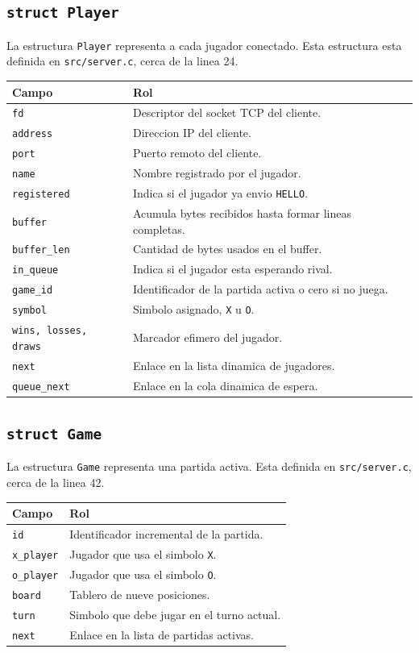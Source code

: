 \documentclass[12pt,a4paper]{article}
\begin{document}
\subsection{\texttt{struct Player}}

La estructura \texttt{Player} representa a cada jugador conectado. Esta
estructura esta definida en \texttt{src/server.c}, cerca de la linea 24.

\begin{longtable}{|p{4cm}|p{10cm}|}
\hline
\textbf{Campo} & \textbf{Rol} \\
\hline
\texttt{fd} & Descriptor del socket TCP del cliente. \\
\hline
\texttt{address} & Direccion IP del cliente. \\
\hline
\texttt{port} & Puerto remoto del cliente. \\
\hline
\texttt{name} & Nombre registrado por el jugador. \\
\hline
\texttt{registered} & Indica si el jugador ya envio \texttt{HELLO}. \\
\hline
\texttt{buffer} & Acumula bytes recibidos hasta formar lineas completas. \\
\hline
\texttt{buffer\_len} & Cantidad de bytes usados en el buffer. \\
\hline
\texttt{in\_queue} & Indica si el jugador esta esperando rival. \\
\hline
\texttt{game\_id} & Identificador de la partida activa o cero si no juega. \\
\hline
\texttt{symbol} & Simbolo asignado, \texttt{X} u \texttt{O}. \\
\hline
\texttt{wins, losses, draws} & Marcador efimero del jugador. \\
\hline
\texttt{next} & Enlace en la lista dinamica de jugadores. \\
\hline
\texttt{queue\_next} & Enlace en la cola dinamica de espera. \\
\hline
\end{longtable}

\subsection{\texttt{struct Game}}

La estructura \texttt{Game} representa una partida activa. Esta definida en
\texttt{src/server.c}, cerca de la linea 42.

\begin{longtable}{|p{4cm}|p{10cm}|}
\hline
\textbf{Campo} & \textbf{Rol} \\
\hline
\texttt{id} & Identificador incremental de la partida. \\
\hline
\texttt{x\_player} & Jugador que usa el simbolo \texttt{X}. \\
\hline
\texttt{o\_player} & Jugador que usa el simbolo \texttt{O}. \\
\hline
\texttt{board} & Tablero de nueve posiciones. \\
\hline
\texttt{turn} & Simbolo que debe jugar en el turno actual. \\
\hline
\texttt{next} & Enlace en la lista de partidas activas. \\
\hline
\end{longtable}
\end{document}
